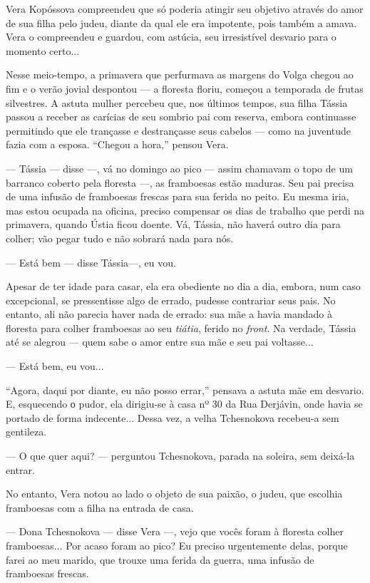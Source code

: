 Vera Kopóssova compreendeu que só poderia atingir seu objetivo através
do amor de sua filha pelo judeu, diante da qual ele era impotente, pois
também a amava. Vera o compreendeu e guardou, com astúcia, seu
irresistível desvario para o momento certo...

Nesse meio-tempo, a primavera que perfurmava as margens do Volga chegou
ao fim e o verão jovial despontou --- a floresta floriu, começou a
temporada de frutas silvestres. A astuta mulher percebeu que, nos
últimos tempos, sua filha Tássia passou a receber as carícias de seu
sombrio pai com reserva, embora continuasse permitindo que ele trançasse
e destrançasse seus cabelos --- como na juventude fazia com a esposa.
``Chegou a hora,'' pensou Vera.

--- Tássia --- disse ---, vá no domingo ao pico --- assim chamavam o
topo de um barranco coberto pela floresta ---, as framboesas estão
maduras. Seu pai precisa de uma infusão de framboesas frescas para sua
ferida no peito. Eu mesma iria, mas estou ocupada na oficina, preciso
compensar os dias de trabalho que perdi na primavera, quando Ústia ficou
doente. Vá, Tássia, não haverá outro dia para colher; vão pegar tudo e
não sobrará nada para nós.

--- Está bem --- disse Tássia---, eu vou.

Apesar de ter idade para casar, ela era obediente no dia a dia, embora,
num caso excepcional, se pressentisse algo de errado, pudesse contrariar
seus pais. No entanto, ali não parecia haver nada de errado: sua mãe a
havia mandado à floresta para colher framboesas ao seu \emph{tiátia},
ferido no \emph{front}. Na verdade, Tássia até se alegrou --- quem sabe
o amor entre sua mãe e seu pai voltasse...

--- Está bem, eu vou...

``Agora, daqui por diante, eu não posso errar,'' pensava a astuta mãe em
desvario. E, esquecendo о pudor, ela dirigiu-se à casa nº 30 da Rua
Derjávin, onde havia se portado de forma indecente... Dessa vez, a velha
Tchesnokova recebeu-a sem gentileza.

--- O que quer aqui? --- perguntou Tchesnokova, parada na soleira, sem
deixá-la entrar.

No entanto, Vera notou ao lado o objeto de sua paixão, o judeu, que
escolhia framboesas com a filha na entrada de casa.

--- Dona Tchesnokova --- disse Vera ---, vejo que vocês foram à floresta
colher framboesas... Por acaso foram ao pico? Eu preciso urgentemente
delas, porque farei ao meu marido, que trouxe uma ferida da guerra, uma
infusão de framboesas frescas.


